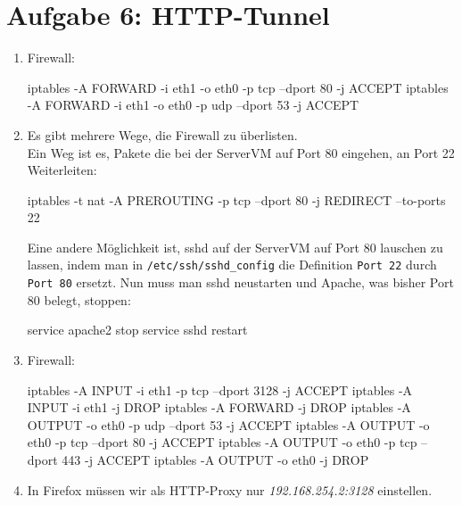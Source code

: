 \documentclass{scrartcl}
\begin{document}
\section*{Aufgabe 6: HTTP-Tunnel}
\label{sec:Aufgabe 6: HTTP-Tunnel}
\begin{enumerate}[\bfseries 1.]
	\item
        Firewall:
        \begin{rootcommands}
iptables -A FORWARD -i eth1 -o eth0 -p tcp --dport 80 -j ACCEPT
iptables -A FORWARD -i eth1 -o eth0 -p udp --dport 53 -j ACCEPT
		\end{rootcommands}

	\item
        Es gibt mehrere Wege, die Firewall zu überlisten.\\
        Ein Weg ist es, Pakete die bei der ServerVM auf Port 80 eingehen,
        an Port 22 Weiterleiten:
		\begin{rootcommands}
iptables -t nat -A PREROUTING -p tcp --dport 80 -j REDIRECT --to-ports 22
		\end{rootcommands}

        Eine andere Möglichkeit ist, sshd auf der ServerVM auf Port 80 lauschen
        zu lassen, indem man in \texttt{/etc/ssh/sshd\_config} die Definition
        \texttt{Port 22} durch \texttt{Port 80} ersetzt. Nun muss man sshd neustarten
        und Apache, was bisher Port 80 belegt, stoppen:

        \begin{rootcommands}
service apache2 stop
service sshd restart
        \end{rootcommands}

	\item
        Firewall:
	    \begin{rootcommands}
iptables -A INPUT -i eth1 -p tcp --dport 3128 -j ACCEPT
iptables -A INPUT -i eth1 -j DROP
iptables -A FORWARD -j DROP
iptables -A OUTPUT -o eth0 -p udp --dport 53 -j ACCEPT
iptables -A OUTPUT -o eth0 -p tcp --dport 80 -j ACCEPT
iptables -A OUTPUT -o eth0 -p tcp --dport 443 -j ACCEPT
iptables -A OUTPUT -o eth0 -j DROP
	    \end{rootcommands}

	\item
        In Firefox müssen wir als HTTP-Proxy nur \textit{192.168.254.2:3128}
        einstellen.


\end{enumerate}
\end{document}
